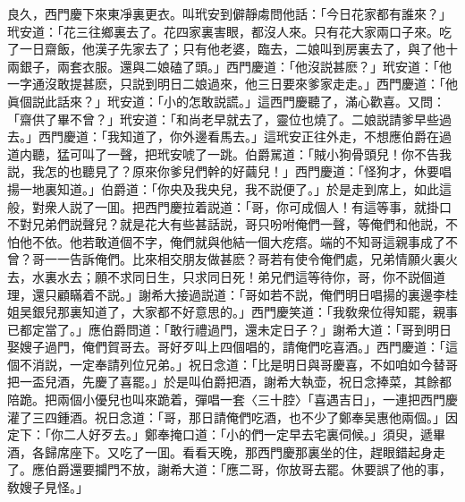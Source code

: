 良久，西門慶下來東凈裏更衣。叫玳安到僻靜䖏問他話：「今日花家都有誰來？」玳安道：「花三往鄉裏去了。花四家裏害眼，都沒人來。只有花大家兩口子來。吃了一日齋飯，他漢子先家去了；只有他老婆，臨去，二娘叫到房裏去了，與了他十兩銀子，兩套衣服。還與二娘磕了頭。」西門慶道：「他沒説甚麽？」玳安道：「他一字通沒敢提甚麽，只説到明日二娘過來，他三日要來爹家走走。」西門慶道：「他眞個説此話來？」玳安道：「小的怎敢説謊。」這西門慶聽了，滿心歡喜。又問：「齋供了畢不曾？」玳安道：「和尚老早就去了，靈位也燒了。二娘説請爹早些過去。」西門慶道：「我知道了，你外邊看馬去。」這玳安正往外走，不想應伯爵在過道内聽，猛可叫了一聲，把玳安唬了一跳。伯爵駡道：「賊小狗骨頭兒！你不告我説，我怎的也聽見了？原來你爹兒們幹的好繭兒！」西門慶道：「怪狗才，休要唱揚一地裏知道。」伯爵道：「你央及我央兒，我不説便了。」於是走到席上，如此這般，對衆人説了一囬。把西門慶拉着説道：「哥，你可成個人！有這等事，就掛口不對兄弟們説聲兒？就是花大有些甚話説，哥只吩咐俺們一聲，等俺們和他説，不怕他不依。他若敢道個不字，俺們就與他結一個大疙瘩。端的不知哥這親事成了不曾？哥一一告訴俺們。比來相交朋友做甚麽？哥若有使令俺們處，兄弟情願火裏火去，水裏水去；願不求同日生，只求同日死！弟兄們這等待你，哥，你不説個道理，還只顧瞞着不説。」謝希大接過説道：「哥如若不説，俺們明日唱揚的裏邊李桂姐吴銀兒那裏知道了，大家都不好意思的。」西門慶笑道：「我敎衆位得知罷，親事已都定當了。」應伯爵問道：「敢行禮過門，還未定日子？」謝希大道：「哥到明日娶嫂子過門，俺們賀哥去。哥好歹叫上四個唱的，請俺們吃喜酒。」西門慶道：「這個不消説，一定奉請列位兄弟。」祝日念道：「比是明日與哥慶喜，不如咱如今替哥把一盃兒酒，先慶了喜罷。」於是叫伯爵把酒，謝希大執壶，祝日念捧菜，其餘都陪跪。把兩個小優兒也叫來跪着，彈唱一套〈三十腔〉「喜遇吉日」，一連把西門慶灌了三四鍾酒。祝日念道：「哥，那日請俺們吃酒，也不少了鄭奉吴惠他兩個。」因定下：「你二人好歹去。」鄭奉掩口道：「小的們一定早去宅裏伺候。」須臾，遞畢酒，各歸席座下。又吃了一囬。看看天晚，那西門慶那裏坐的住，趕眼錯起身走了。應伯爵還要攔門不放，謝希大道：「應二哥，你放哥去罷。休要誤了他的事，敎嫂子見怪。」


